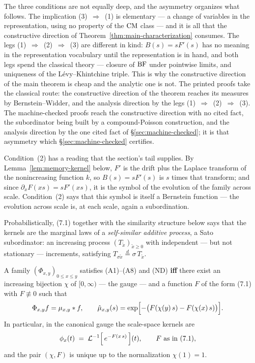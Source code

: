 The three conditions are not equally deep, and the asymmetry organizes what follows. The
implication (3)~$\Rightarrow$~(1) is elementary --- a change of variables in the
representation, using no property of the $\mathrm{CM}$ class --- and it is all that the constructive
direction of Theorem~\ref{thm:main-characterization} consumes. The legs
(1)~$\Rightarrow$~(2)~$\Rightarrow$~(3) are different in kind: $B(s) = sF'(s)$ has no meaning
in the representation vocabulary until the representation is in hand, and both legs spend the
classical theory --- closure of $\mathrm{BF}$ under pointwise limits, and uniqueness of the
Lévy--Khintchine triple. This is why the constructive direction of the main theorem is cheap
and the analytic one is not. The printed proofs take the classical route: the constructive
direction of the theorem reaches its measures by Bernstein--Widder, and the analysis
direction by the legs (1)~$\Rightarrow$~(2)~$\Rightarrow$~(3). The machine-checked proofs
reach the constructive direction with no cited fact, the subordinator being built by a
compound-Poisson construction, and the analysis direction by the one cited fact of
\S\ref{sec:machine-checked}; it is that asymmetry which \S\ref{sec:machine-checked}
certifies.

Condition~(2) has a reading that the section's tail supplies. By Lemma~\ref{lem:memory-kernel}
below, $F'$ is the drift plus the Laplace transform of the nonincreasing function $k$, so
$B(s) = sF'(s)$ is $s$ times that transform; and since $\partial_x F(xs) = sF'(xs)$, it is the
symbol of the evolution of the family across scale. Condition~(2) says that this symbol is
itself a Bernstein function --- the evolution across scale is, at each scale, again a
subordination.

\begin{remark}\label{rem:sato-reading}
Probabilistically, (7.1) together with the similarity structure
below says that the kernels are the marginal laws of a \emph{self-similar additive process},
a Sato subordinator: an increasing process $(T_{\tilde x})_{\tilde x \ge 0}$ with independent
--- but not stationary --- increments, satisfying
$T_{\sigma \tilde x} \stackrel{d}{=} \sigma\, T_{\tilde x}$.
\end{remark}

\begin{theorem}\label{thm:main-characterization}
A family $(\Phi_{x,y})_{0 \le x \le y}$ satisfies (A1)--(A8) and (ND) \textbf{iff} there exist
an increasing bijection $\chi$ of $[0,\infty)$ --- the gauge --- and a function $F$ of the
form (7.1) with $F \not\equiv 0$ such that
\[
  \Phi_{x,y} f = \mu_{x,y} * f, \qquad
  \hat\mu_{x,y}(s) = \exp\Bigl[-\bigl(F(\chi(y)\,s) - F(\chi(x)\,s)\bigr)\Bigr].
\]
In particular, in the canonical gauge the scale-space kernels are
\[
  \phi_{x}(t) \;=\; \mathcal{L}^{-1}\Bigl[\, e^{-F(x\,s)} \,\Bigr](t),
  \qquad F \text{ as in } (7.1),
\]
and the pair $(\chi, F)$ is unique up to the normalization $\chi(1) = 1$.
\end{theorem}

